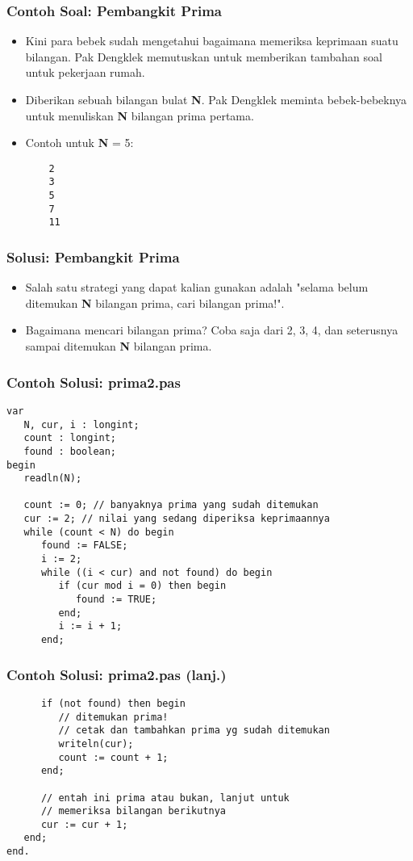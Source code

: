 \documentclass{beamer}
\begin{document}
\begin{frame}[fragile]
\frametitle{Contoh Soal: Pembangkit Prima}
\begin{itemize}
	\item Kini para bebek sudah mengetahui bagaimana memeriksa keprimaan suatu bilangan. Pak Dengklek memutuskan untuk memberikan tambahan soal untuk pekerjaan rumah.
	\item Diberikan sebuah bilangan bulat \textbf{N}. Pak Dengklek meminta bebek-bebeknya untuk menuliskan \textbf{N} bilangan prima pertama.
	\item Contoh untuk \textbf{N} = 5:
	\begin{lstlisting}
	2
	3
	5
	7
	11
	\end{lstlisting}
\end{itemize}
\end{frame}

\begin{frame}
\frametitle{Solusi: Pembangkit Prima}
\begin{itemize}
	\item Salah satu strategi yang dapat kalian gunakan adalah "selama belum ditemukan \textbf{N} bilangan prima, cari bilangan prima!".
	\item Bagaimana mencari bilangan prima? Coba saja dari 2, 3, 4, dan seterusnya sampai ditemukan \textbf{N} bilangan prima.
\end{itemize}
\end{frame}

\begin{frame}[fragile]
\frametitle{Contoh Solusi: prima2.pas}
\begin{lstlisting}
var
   N, cur, i : longint;
   count : longint;
   found : boolean;
begin
   readln(N);

   count := 0; // banyaknya prima yang sudah ditemukan
   cur := 2; // nilai yang sedang diperiksa keprimaannya
   while (count < N) do begin
      found := FALSE;
      i := 2;
      while ((i < cur) and not found) do begin
         if (cur mod i = 0) then begin
            found := TRUE;
         end;
         i := i + 1;
      end;
\end{lstlisting}
\end{frame}

\begin{frame}[fragile]
\frametitle{Contoh Solusi: prima2.pas (lanj.)}
\begin{lstlisting}
      if (not found) then begin
         // ditemukan prima! 
         // cetak dan tambahkan prima yg sudah ditemukan
         writeln(cur);
         count := count + 1;
      end;

      // entah ini prima atau bukan, lanjut untuk 
      // memeriksa bilangan berikutnya
      cur := cur + 1;
   end;
end.
\end{lstlisting}
\end{frame}
\end{document}
